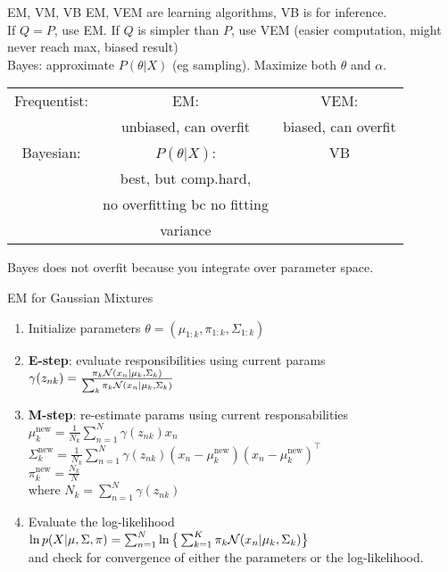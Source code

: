 \documentclass[a4paper,landscape]{amsmlaj}
\makeatletter
\renewcommand{\section}{\@startsection{section}{1}{0mm}
	{-0ex plus -.1ex minus -.5ex}
	{0.1ex plus .7ex}
	{\normalfont\large\bfseries}}
\renewcommand{\subsection}{\@startsection{subsection}{2}{0mm}
	{-1ex plus -.5ex minus -.2ex}
	{0.1ex plus .2ex}
	{\normalfont\normalsize\bfseries}}
\makeatother
\begin{document}
\begin{multicols*}{3}
\section{EM, VM, VB}
EM, VEM are learning algorithms, VB is for inference.\\
If $Q=P$, use EM. If $Q$ is simpler than $P$, use VEM (easier computation, might
never reach max, biased result)\\
Bayes: approximate $P(\theta|X)$ (eg sampling). Maximize both $\theta$ and $\alpha$.\\
\begin{tabular}{|c|c|c|}
\hline
Frequentist: & EM:  & VEM: \\
 & unbiased, can overfit & biased, can overfit\\
\hline
Bayesian: & $P(\theta|X)$: & VB\\
& best, but comp.hard,  & \\
& no overfitting bc no fitting & \\
& variance & \\
\hline
\end{tabular}
Bayes does not overfit because you integrate over parameter space.

\subsection{EM for Gaussian Mixtures}
\begin{enumerate} \setlength\itemsep{-1mm}
	\item Initialize parameters $\theta = (\mu_{1:k},\pi_{1:k},\Sigma_{1:k})$
	\item \textbf{E-step}: evaluate responsibilities using current params \\
		$\gamma(z_{nk})
			=\frac{\pi_k \mathcal{N}(x_n|\mu_k,\Sigma_k)}{\sum_k \pi_k\mathcal{N}(x_n|\mu_k,\Sigma_k)}$
	\item \textbf{M-step}: re-estimate params using current responsabilities \\
		$\mu_k^\text{new}
			= \frac{1}{N_k}\sum_{n=1}^N\gamma(z_{nk})x_n$ \\
		$\Sigma_k^\text{new}
			= \frac{1}{N_k}\sum_{n=1}^N\gamma(z_{nk})
				(x_n-\mu_k^\text{new})(x_n-\mu_k^\text{new})^\top$ \\
		$\pi_k^\text{new} = \frac{N_k}{N}$ \\
		where $N_k = \sum_{n=1}^N\gamma(z_{nk})$
	\item Evaluate the log-likelihood \\
		$\ln p(X|\mu,\Sigma,\pi)
			= \sum_{n=1}^N\ln \big\{ \sum_{k=1}^K\pi_k\mathcal{N}(x_n|\mu_k,\Sigma_k) \big\}$ \\
		and check for convergence of either the parameters or the log-likelihood.
\end{enumerate}


\end{multicols*}
\end{document}
